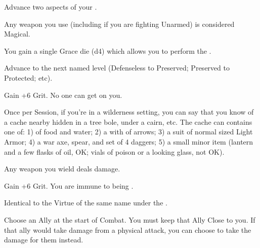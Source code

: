 \begin{multicols*}{2}
Advance two  aspects of your  \DCUP.


Any weapon you use (including if you are fighting Unarmed) is considered Magical.


You gain a single Grace die (d4) which allows you to perform the .


Advance   to the next named level (Defenseless to Preserved; Preserved to Protected; etc).


Gain +6 \MAX Grit. No one can get  on you.  


Once per Session, if you're in a wilderness setting, you can say that you know of a cache nearby hidden in a tree bole, under a cairn, etc.  The cache can contains one of: 1)  of food and water; 2) a  with  of arrows; 3) a suit of normal sized Light Armor; 4) a war axe, spear, and set of 4 daggers; 5) a small minor item (lantern and a few flasks of oil, OK; vials of poison or a looking glass, not OK).


Any \VIG weapon you wield deals \DCUP damage.


Gain +6 \MAX Grit. You are immune to being .  



Identical to the Virtue of the same name under the .


\cbreak



Choose an Ally at the start of Combat.  You must keep that Ally Close to you. If that ally would take damage from a physical attack, you can choose to take the damage for them instead.

\end{multicols*}



